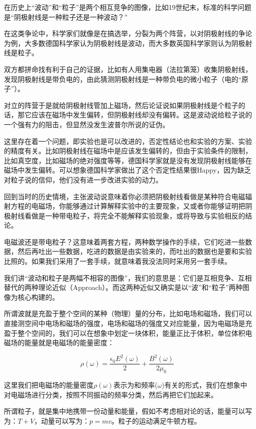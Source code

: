 在历史上“波动”和“粒子”是两个相互竞争的图像，比如19世纪末，标准的科学问题是“阴极射线是一种粒子还是一种波动？”

在这类争论中，科学家们就像是在搞选举，分裂为两个阵营，以对阴极射线的争论为例，大多数德国科学家认为阴极射线是波动，而大多数英国科学家则认为阴极射线是粒子。

双方都拼命找有利于自己的证据，比如有人用集电器（法拉第笼）收集阴极射线，发现阴极射线是带负电的，由此猜测阴极射线是一种带负电的微小粒子（电的“原子”）。

对立的阵营于是就给阴极射线管加上磁场，然后论证说如果阴极射线是个粒子的话，那它应该在磁场中发生偏转，但阴极射线却没有偏转。这是波动说给粒子说的一个强有力的阻击，但显然没发生波普尔所说的证伪。

这里存在着一个问题，即实验也是可以改进的，否定性结论也和实验的方案、实验的精度有关。比如阴极射线在磁场中是应该发生偏转的，但由于实验条件的限制，比如真空度，比如磁场的绝对强度等等，德国科学家就是没有发现阴极射线能够在磁场中发生偏转。可以想象德国科学家做出了这个否定性结果很Happy，因为缺乏对粒子说的信仰，他们没有进一步改进实验的动力。

回到当时的历史情境，主张波动说意味着你必须把阴极射线看做是某种符合电磁辐射方程的电磁场，你能够通过计算解释实验中的主要现象，又或者你能够证明把阴极射线看做是一种带电粒子，将完全不能解释实验现象，或将导致与实验相反的结论。

电磁波还是带电粒子？这意味着两套方程，两种数学操作的手续，它们吃进一些数据，然后再吐出一些数据，吃进的数据是由实验来的，而吐出的数据也是要和实验比照的。如果我们采用了一套手续，就意味着我没法同时采用另一套手续。

我们讲“波动和粒子是两幅不相容的图像”，我们的意思是：它们是互相竞争、互相替代的两种理论近似（Approach）。而这两种近似又确实是以“波”和“粒子”两种图像为核心构建的。

所谓波就是充盈于整个空间的某种（物理）量的分布，比如电场和磁场，我们可以直接测空间中电场和磁场的强度，电场和磁场的强度又对应能量，因为电磁场是充盈于整个空间的，我们可以在想象中划定一块体积，能量正比于体积，单位体积电磁场的能量就是电磁场的能量密度：

\begin{equation}
\rho(\omega) = \frac{\epsilon_0 E^2(\omega)}{2} + \frac{B^2(\omega)}{2 \mu_0}~
\end{equation}

这里我们把电磁场的能量密度$\rho(\omega) $表示为和频率($\omega$)有关的形式，我们在想象中对电磁场进行分类，按照不同振动的频率分类，然后再把它们加起来。

所谓粒子，就是集中地携带一份动量和能量，假如不考虑相对论的话，能量可以写为：$T + V$，动量可以写为：$p = mv$。粒子的运动满足牛顿方程。

